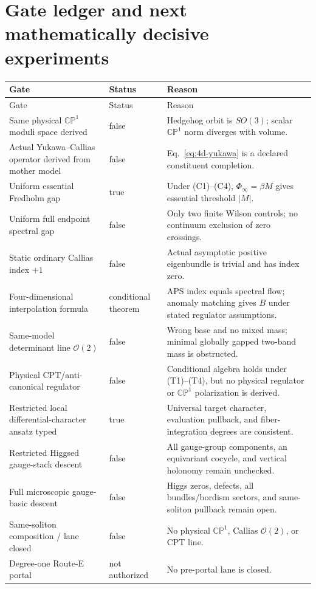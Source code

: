 \documentclass[11pt]{article}
\theoremstyle{definition}
\theoremstyle{remark}
\newcommand{\CP}{\mathbb {CP}}
\newcommand{\cO}{\mathcal O}
\newcommand{\status}[1]{\textcolor{blue!60!black}{\textsf{#1}}}
\begin{document}
\section{Gate ledger and next mathematically decisive experiments}

\begin{longtable}{@{}L{0.39\textwidth}L{0.14\textwidth}L{0.39\textwidth}@{}}
\toprule
Gate & Status & Reason\\
\midrule
\endfirsthead
\toprule
Gate & Status & Reason\\
\midrule
\endhead
Same physical \(\CP^1\) moduli space derived
 & \status{false}
 & Hedgehog orbit is \(SO(3)\); scalar \(\CP^1\) norm diverges with volume.\\
Actual Yukawa--Callias operator derived from mother model
 & \status{false}
 & Eq.~\eqref{eq:4d-yukawa} is a declared constituent completion.\\
Uniform essential Fredholm gap
 & \status{true}
 & Under (C1)--(C4), \(\Phi_\infty=\beta M\) gives essential threshold \( |M| \).\\
Uniform full endpoint spectral gap
 & \status{false}
 & Only two finite Wilson controls; no continuum exclusion of zero crossings.\\
Static ordinary Callias index \(+1\)
 & \status{false}
 & Actual asymptotic positive eigenbundle is trivial and has index zero.\\
Four-dimensional interpolation formula
 & \status{conditional theorem}
 & APS index equals spectral flow; anomaly matching gives \(B\) under stated regulator assumptions.\\
Same-model determinant line \(\cO(2)\)
 & \status{false}
 & Wrong base and no mixed mass; minimal globally gapped two-band mass is obstructed.\\
Physical CPT/anti-canonical regulator
 & \status{false}
 & Conditional algebra holds under (T1)--(T4), but no physical regulator or \(\CP^1\) polarization is derived.\\
Restricted local differential-character ansatz typed
 & \status{true}
 & Universal target character, evaluation pullback, and fiber-integration degrees are consistent.\\
Restricted Higgsed gauge-stack descent
 & \status{false}
 & All gauge-group components, an equivariant cocycle, and vertical holonomy remain unchecked.\\
Full microscopic gauge-basic descent
 & \status{false}
 & Higgs zeros, defects, all bundles/bordism sectors, and same-soliton pullback remain open.\\
Same-soliton composition / lane closed
 & \status{false}
 & No physical \(\CP^1\), Callias \(\cO(2)\), or CPT line.\\
Degree-one Route-E portal
 & \status{not authorized}
 & No pre-portal lane is closed.\\
\bottomrule
\end{longtable}
\end{document}
